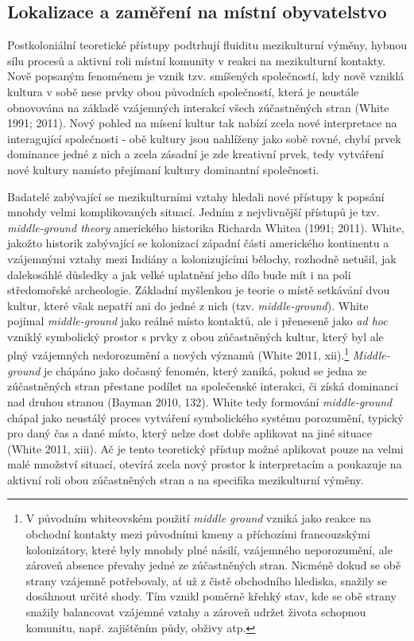 \subsection[lokalizace-a-zaměření-na-místní-obyvatelstvo]{Lokalizace a zaměření na místní obyvatelstvo}

Postkoloniální teoretické přístupy podtrhují fluiditu mezikulturní výměny, hybnou sílu procesů a aktivní roli místní komunity v reakci na mezikulturní kontakty. Nově popsaným fenoménem je vznik tzv. smíšených společností, kdy nově vzniklá kultura v sobě nese prvky obou původních společností, která je neustále obnovována na základě vzájemných interakcí všech zúčastněných stran (White 1991; 2011). Nový pohled na mísení kultur tak nabízí zcela nové interpretace na interagující společnosti - obě kultury jsou nahlíženy jako sobě rovné, chybí prvek dominance jedné z nich a zcela zásadní je zde kreativní prvek, tedy vytváření nové kultury namísto přejímaní kultury dominantní společnosti.

Badatelé zabývající se mezikulturními vztahy hledali nové přístupy k popsání mnohdy velmi komplikovaných situací. Jedním z nejvlivnější přístupů je tzv. {\em middle-ground theory} amerického historika Richarda Whitea (1991; 2011). White, jakožto historik zabývající se kolonizací západní části amerického kontinentu a vzájemnými vztahy mezi Indiány a kolonizujícími bělochy, rozhodně netušil, jak dalekosáhlé důsledky a jak velké uplatnění jeho dílo bude mít i na poli středomořské archeologie. Základní myšlenkou je teorie o místě setkávání dvou kultur, které však nepatří ani do jedné z nich (tzv. {\em middle-ground}). White pojímal {\em middle-ground} jako reálné místo kontaktů, ale i přeneseně jako {\em ad hoc} vzniklý symbolický prostor s prvky z obou zúčastněných kultur, který byl ale plný vzájemných nedorozumění a nových významů (White 2011, xii).\footnote{V původním whiteovském použití {\em middle ground} vzniká jako reakce na obchodní kontakty mezi původními kmeny a příchozími francouzskými kolonizátory, které byly mnohdy plné násilí, vzájemného neporozumění, ale zároveň absence převahy jedné ze zúčastněných stran. Nicméně dokud se obě strany vzájemně potřebovaly, ať už z čistě obchodního hlediska, snažily se dosáhnout určité shody. Tím vznikl poměrně křehký stav, kde se obě strany snažily balancovat vzájemné vztahy a zároveň udržet života schopnou komunitu, např. zajištěním půdy, obživy atp.} {\em Middle-ground} je chápáno jako dočasný fenomén, který zaniká, pokud se jedna ze zúčastněných stran přestane podílet na společenské interakci, či získá dominanci nad druhou stranou (Bayman 2010, 132). White tedy formování {\em middle-ground} chápal jako neustálý proces vytváření symbolického systému porozumění, typický pro daný čas a dané místo, který nelze dost dobře aplikovat na jiné situace (White 2011, xiii). Ač je tento teoretický přístup možné aplikovat pouze na velmi malé množství situací, otevírá zcela nový prostor k interpretacím a poukazuje na aktivní roli obou zúčastněných stran a na specifika mezikulturní výměny.

